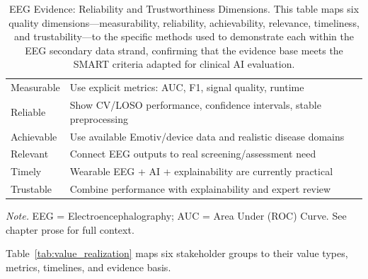 {\tablestripes\tablefontsize
{}
\begin{xltabular}{\textwidth}{@{} l L @{}}
\caption[EEG Evidence: Reliability and Trustworthiness Dimensions]{EEG Evidence: Reliability and Trustworthiness Dimensions. This table maps six quality dimensions---measurability, reliability, achievability, relevance, timeliness, and trustability---to the specific methods used to demonstrate each within the EEG secondary data strand, confirming that the evidence base meets the SMART criteria adapted for clinical AI evaluation.}\label{tab:eeg_reliability_trust} \\
\toprule
{} &  \\
\midrule
\endfirsthead
\endhead
\bottomrule
\endlastfoot
Measurable & Use explicit metrics: AUC, F1, signal quality, runtime \\
Reliable & Show CV/LOSO performance, confidence intervals, stable preprocessing \\
Achievable & Use available Emotiv/device data and realistic disease domains \\
Relevant & Connect EEG outputs to real screening/assessment need \\
Timely & Wearable EEG + AI + explainability are currently practical \\
Trustable & Combine performance with explainability and expert review \\
\end{xltabular}}
\vspace{0.3em}\noindent\textit{Note.} EEG = Electroencephalography; AUC = Area Under (ROC) Curve. See chapter prose for full context.

\iffalse
Table~\ref{tab:value_realization} maps six stakeholder groups to their value types, metrics, timelines, and evidence basis.

